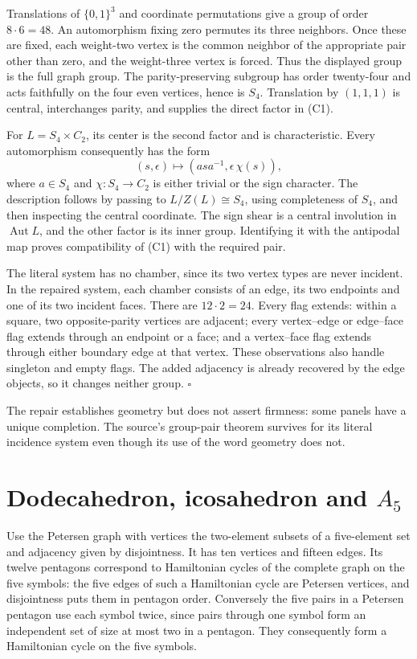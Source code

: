 Translations of \(\{0,1\}^3\) and coordinate permutations give a group
of order \(8\cdot6=48\). An automorphism fixing zero permutes its three
neighbors. Once these are fixed, each weight-two vertex is the common
neighbor of the appropriate pair other than zero, and the weight-three
vertex is forced. Thus the displayed group is the full graph group. The
parity-preserving subgroup has order twenty-four and acts faithfully on
the four even vertices, hence is \(S_4\). Translation by \((1,1,1)\) is
central, interchanges parity, and supplies the direct factor in (C1).

For \(L=S_4\times C_2\), its center is the second factor and is
characteristic. Every automorphism consequently has the form \[
(s,\epsilon)\longmapsto
(a s a^{-1},\epsilon\,\chi(s)),
\] where \(a\in S_4\) and \(\chi:S_4\to C_2\) is either trivial or the
sign character. The description follows by passing to
\(L/Z(L)\cong S_4\), using completeness of \(S_4\), and then inspecting
the central coordinate. The sign shear is a central involution in
\(\operatorname{Aut}L\), and the other factor is its inner group.
Identifying it with the antipodal map proves compatibility of (C1) with
the required pair.

The literal system has no chamber, since its two vertex types are never
incident. In the repaired system, each chamber consists of an edge, its
two endpoints and one of its two incident faces. There are
\(12\cdot2=24\). Every flag extends: within a square, two
opposite-parity vertices are adjacent; every vertex--edge or edge--face
flag extends through an endpoint or a face; and a vertex--face flag
extends through either boundary edge at that vertex. These observations
also handle singleton and empty flags. The added adjacency is already
recovered by the edge objects, so it changes neither group. \(\square\)

The repair establishes geometry but does not assert firmness: some
panels have a unique completion. The source's group-pair theorem
survives for its literal incidence system even though its use of the
word geometry does not.

\section{\texorpdfstring{Dodecahedron, icosahedron and
\(A_5\)}{Dodecahedron, icosahedron and A\_5}}\label{dodecahedron-icosahedron-and-a_5}

Use the Petersen graph with vertices the two-element subsets of a
five-element set and adjacency given by disjointness. It has ten
vertices and fifteen edges. Its twelve pentagons correspond to
Hamiltonian cycles of the complete graph on the five symbols: the five
edges of such a Hamiltonian cycle are Petersen vertices, and
disjointness puts them in pentagon order. Conversely the five pairs in a
Petersen pentagon use each symbol twice, since pairs through one symbol
form an independent set of size at most two in a pentagon. They
consequently form a Hamiltonian cycle on the five symbols.

